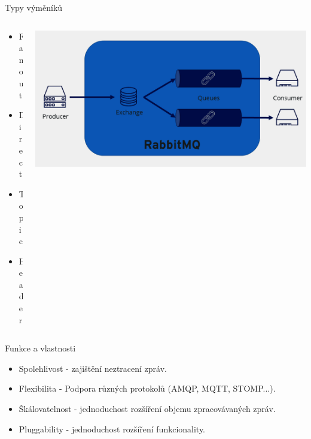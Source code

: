 \documentclass{beamer}
\begin{document}
\begin{frame}{Typy výměníků}
	\begin{columns}
    \begin{column}{0.2\textwidth}
      \begin{itemize}
        \item Fanout
        \item Direct
        \item Topic
        \item Header
      \end{itemize}
    \end{column}
    
    \begin{column}{0.8\textwidth}
      \centering
      \includegraphics[width=\textwidth]{obrazky/rabbitmq.png}
    \end{column}
  \end{columns}
\end{frame}

\begin{frame}{Funkce a vlastnosti}
	\begin{itemize}
		\item Spolehlivost - zajištění neztracení zpráv.
		\item Flexibilita - Podpora různých protokolů (AMQP, MQTT, STOMP...).
		\item Škálovatelnost - jednoduchost rozšíření objemu zpracovávaných zpráv.
		\item Pluggability - jednoduchost rozšíření funkcionality.
	\end{itemize}
\end{frame}
\end{document}

